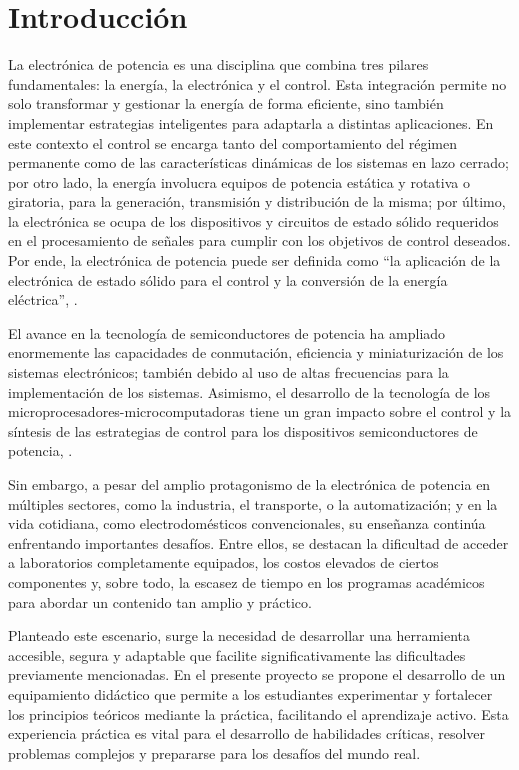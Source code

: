 \section{Introducción}
\justifying

La electrónica de potencia es una disciplina que combina tres pilares fundamentales: la energía, la electrónica y el control. Esta integración permite no solo transformar y gestionar la energía de forma eficiente, sino también implementar estrategias inteligentes para adaptarla a distintas aplicaciones. En este contexto el control se encarga tanto del comportamiento del régimen permanente como de las características dinámicas de los sistemas en lazo cerrado; por otro lado, la energía involucra equipos de potencia estática y rotativa o giratoria, para la generación, transmisión y distribución de la misma; por último, la electrónica se ocupa de los dispositivos y circuitos de estado sólido requeridos en el procesamiento de señales para cumplir con los objetivos de control deseados. Por ende, la electrónica de potencia puede ser definida como ``la aplicación de la electrónica de estado sólido para el control y la conversión de la energía eléctrica'', \parencite{RASHID-SPANISH}.

El avance en la tecnología de semiconductores de potencia ha ampliado enormemente las capacidades de conmutación, eficiencia y miniaturización de los sistemas electrónicos; también debido al uso de altas frecuencias para la implementación de los sistemas. Asimismo, el desarrollo de la tecnología de los microprocesadores-microcomputadoras tiene un gran impacto sobre el control y la síntesis de las estrategias de control para los dispositivos semiconductores de potencia, \parencite{RASHID-SPANISH}.

Sin embargo, a pesar del amplio protagonismo de la electrónica de potencia en múltiples sectores, como la industria, el transporte, o la automatización; y en la vida cotidiana, como electrodomésticos convencionales, su enseñanza continúa enfrentando importantes desafíos. Entre ellos, se destacan la dificultad de acceder a laboratorios completamente equipados, los costos elevados de ciertos componentes y, sobre todo, la escasez de tiempo en los programas académicos para abordar un contenido tan amplio y práctico.

Planteado este escenario, surge la necesidad de desarrollar una herramienta accesible, segura y adaptable que facilite significativamente las dificultades previamente mencionadas. En el presente proyecto se propone el desarrollo de un equipamiento didáctico que permite a los estudiantes experimentar y fortalecer los principios teóricos mediante la práctica, facilitando el aprendizaje activo. Esta experiencia práctica es vital para el desarrollo de habilidades críticas, resolver problemas complejos y prepararse para los desafíos del mundo real.

